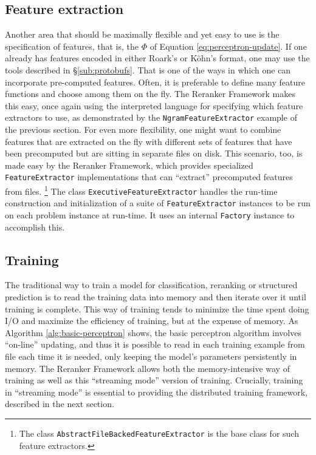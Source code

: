 \documentclass[a4paper]{article}
\begin{document}
\subsection{Feature extraction}

Another area that should be maximally flexible and yet easy to use
is the specification of features, that is, the $\Phi$ of Equation
\ref{eq:perceptron-update}. If one already has features encoded in
either Roark's or Köhn's format, one may use the tools described in
\S\ref{sub:protobufs}. That is one of the ways in which one can
incorporate pre-computed features. Often, it is preferable to define
many feature functions and choose among them on the fly. The Reranker
Framework makes this easy, once again using the interpreted language
for specifying which feature extractors to use, as demonstrated by
the \texttt{NgramFeatureExtractor} example of the previous section.
For even more flexibility, one might want to combine features that
are extracted on the fly with different sets of features that have
been precomputed but are sitting in separate files on disk. This scenario,
too, is made easy by the Reranker Framework, which provides specialized
\texttt{FeatureExtractor} implementations that can ``extract'' precomputed
features from files.%
\footnote{The class \texttt{AbstractFileBackedFeatureExtractor} is the base
class for such feature extractors.%
} The class \texttt{ExecutiveFeatureExtractor} handles the run-time
construction and initialization of a suite of \texttt{FeatureExtractor}\emph{
}instances to be run on each problem instance at run-time. It uses
an internal \texttt{Factory} instance to accomplish this. 


\subsection{Training}

The traditional way to train a model for classification, reranking
or structured prediction is to read the training data into memory
and then iterate over it until training is complete. This way of training
tends to minimize the time spent doing I/O and maximize the efficiency
of training, but at the expense of memory. As Algorithm \ref{alg:basic-perceptron}
shows, the basic perceptron algorithm involves ``on-line'' updating,
and thus it is possible to read in each training example from file
each time it is needed, only keeping the model's parameters persistently
in memory. The Reranker Framework allows both the memory-intensive
way of training as well as this ``streaming mode'' version of training.
Crucially, training in ``streaming mode'' is essential to providing
the distributed training framework, described in the next section.
\end{document}
